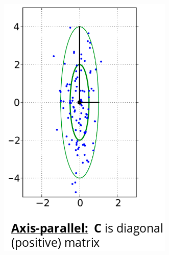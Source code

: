 \documentclass{book}
\begin{document}
\begin{itemize}
\begin{figure}[H]
\begin{minipage}[c]{0.3\textwidth}
        \end{minipage}\hfill
        \begin{minipage}[c]{0.3\textwidth}
            \centering
            \includegraphics[width=\textwidth]{images/axis_parallel_mutation.png}
        \end{minipage}\hfill
        \begin{minipage}[c]{0.3\textwidth}
            \centering

\end{minipage}
\end{figure}
\end{itemize}
\end{document}
